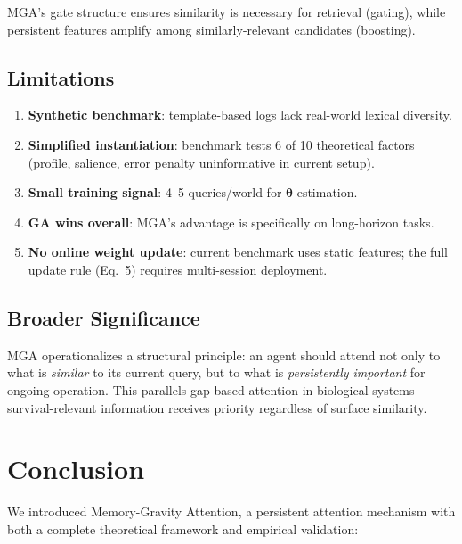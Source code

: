 \documentclass{article}
\begin{document}
MGA's gate structure ensures similarity is necessary for retrieval (gating), while persistent features amplify among similarly-relevant candidates (boosting).

\subsection{Limitations}

\begin{enumerate}[leftmargin=2em,itemsep=2pt]
\item \textbf{Synthetic benchmark}: template-based logs lack real-world lexical diversity.
\item \textbf{Simplified instantiation}: benchmark tests 6 of 10 theoretical factors (profile, salience, error penalty uninformative in current setup).
\item \textbf{Small training signal}: 4--5 queries/world for $\boldsymbol{\theta}$ estimation.
\item \textbf{GA wins overall}: MGA's advantage is specifically on long-horizon tasks.
\item \textbf{No online weight update}: current benchmark uses static features; the full update rule (Eq.~5) requires multi-session deployment.
\end{enumerate}

\subsection{Broader Significance}

MGA operationalizes a structural principle: an agent should attend not only to what is \emph{similar} to its current query, but to what is \emph{persistently important} for ongoing operation. This parallels gap-based attention in biological systems---survival-relevant information receives priority regardless of surface similarity.

\section{Conclusion}

We introduced Memory-Gravity Attention, a persistent attention mechanism with both a complete theoretical framework and empirical validation:
\end{document}
